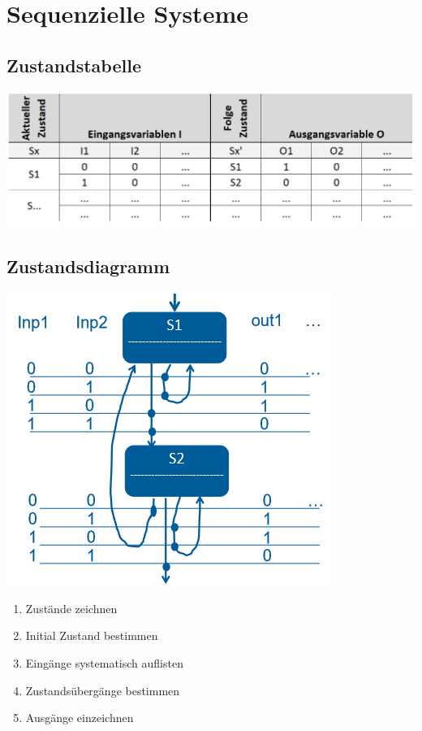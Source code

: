 \section{Sequenzielle Systeme}
\subsection{Zustandstabelle}
\includegraphics[width=\columnwidth,keepaspectratio=true]{./Images/zustandstabelle.png}

\subsection{Zustandsdiagramm}
\begin{minipage}{\textwidth}	
	\begin{minipage}{0.25\textwidth}
		\includegraphics[width=\linewidth,keepaspectratio=true]{./Images/zustandsdiagram.png}
	\end{minipage}%
	\begin{minipage}{0.25\textwidth}
		\begin{enumerate}
			\item Zustände zeichnen 
			\item Initial Zustand bestimmen
			\item Eingänge systematisch auflisten
			\item Zustandsübergänge bestimmen
			\item Ausgänge einzeichnen
		\end{enumerate}
	\end{minipage}
\end{minipage}

